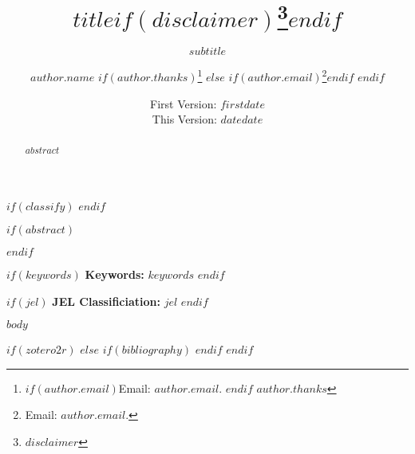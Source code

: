 \documentclass[$if(fontsize)$$fontsize$$else$11pt$endif$,$for(classoption)$$classoption$$sep$,$endfor$]{article}
\title{$title$$if(disclaimer)$\thanks{$disclaimer$}$endif$}
\subtitle{$subtitle$}
\author{$author.name$%
        $if(author.thanks)$\thanks{%
            $if(author.email)$Email: $author.email$. $endif$%
            $author.thanks$}%
        $else$%
            $if(author.email)$\thanks{Email:  $author.email$.}$endif$%
        $endif$}
\affil{$author.affil$}
\date{First Version:  $firstdate$ \\[0.5em] This Version:  $date$}
\date{$date$}
\begin{document}
\maketitle
\thispagestyle{fancy}
$if(classify)$
$endif$

$if(abstract)$
\begin{abstract}
$abstract$
\end{abstract}
\smallskip
$endif$

$if(keywords)$
\hspace{4mm}\textbf{Keywords:}  $keywords$
\smallskip
$endif$

$if(jel)$
\hspace{4mm}\textbf{JEL Classificiation:} $jel$
$endif$

\clearpage
{}
\fancyfoot[C]{\thepage}
\doublespacing
\raggedright
\setlength\parindent{1.5em}

$body$

$if(zotero2r)$
  \newpage
  \printbibliography
$else$
  $if(bibliography)$
    \newpage
    \printbibliography[title={References}]
  $endif$
$endif$
\end{document}
